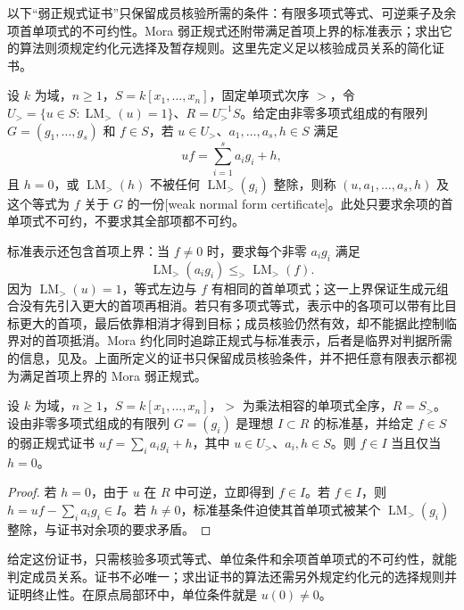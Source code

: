 以下“弱正规式证书”只保留成员核验所需的条件：有限多项式等式、可逆乘子及余项首单项式的不可约性。Mora 弱正规式还附带满足首项上界的标准表示；求出它的算法则须规定约化元选择及暂存规则。这里先定义足以核验成员关系的简化证书。

\begin{definition}\label{b3:def:F-weak-normal-form}
	设 \(k\) 为域，\(n\ge1\)，\(S=k[x_1,\ldots,x_n]\)，固定单项式次序 \(>\)，令 \(U_{>}=\{u\in S:\operatorname{LM}_{>}(u)=1\}\)、\(R=U_{>}^{-1}S\)。给定由非零多项式组成的有限列 \(G=(g_1,\ldots,g_s)\) 和 \(f\in S\)，若 \(u\in U_{>}\)、\(a_1,\ldots,a_s,h\in S\) 满足
	\[
		uf=\sum_{i=1}^s a_ig_i+h,
	\]
	且 \(h=0\)，或 \(\operatorname{LM}_{>}(h)\) 不被任何 \(\operatorname{LM}_{>}(g_i)\) 整除，则称 \((u,a_1,\ldots,a_s,h)\) 及这个等式为 \(f\) 关于 \(G\) 的一份[weak normal form certificate]。此处只要求余项的首单项式不可约，不要求其全部项都不可约。
\end{definition}

标准表示还包含首项上界：当 \(f\ne0\) 时，要求每个非零 \(a_ig_i\) 满足
\[
	\operatorname{LM}_{>}(a_ig_i) \le_{>}\operatorname{LM}_{>}(f).
\]
因为 \(\operatorname{LM}_{>}(u)=1\)，等式左边与 \(f\) 有相同的首单项式；这一上界保证生成元组合没有先引入更大的首项再相消。若只有多项式等式，表示中的各项可以带有比目标更大的首项，最后依靠相消才得到目标；成员核验仍然有效，却不能据此控制临界对的首项抵消。Mora 约化同时追踪正规式与标准表示，后者是临界对判据所需的信息，见\cite[Definitions 5--6, Section 3.1]{MoraPfisterTraverso1989TangentCone}及\cite[Section 2, Theorem 2.14]{Aschenbrenner2005ReductionStandardBases}。上面所定义的证书只保留成员核验条件，并不把任意有限表示都视为满足首项上界的 Mora 弱正规式。

\begin{proposition}\label{b3:prop:F-weak-membership}
	设 \(k\) 为域，\(n\ge1\)，\(S=k[x_1,\ldots,x_n]\)，\(>\) 为乘法相容的单项式全序，\(R=S_{>}\)。设由非零多项式组成的有限列 \(G=(g_i)\) 是理想 \(I\subset R\) 的标准基，并给定 \(f\in S\) 的弱正规式证书 \(uf=\sum_i a_i g_i+h\)，其中 \(u\in U_{>}\)、\(a_i,h\in S\)。则 \(f\in I\) 当且仅当 \(h=0\)。
\end{proposition}
\begin{proof}
	若 \(h=0\)，由于 \(u\) 在 \(R\) 中可逆，立即得到 \(f\in I\)。若 \(f\in I\)，则 \(h=uf-\sum_i a_ig_i\in I\)。若 \(h\ne0\)，标准基条件迫使其首单项式被某个 \(\operatorname{LM}_{>}(g_i)\) 整除，与证书对余项的要求矛盾。
\end{proof}

给定这份证书，只需核验多项式等式、单位条件和余项首单项式的不可约性，就能判定成员关系。证书不必唯一；求出证书的算法还需另外规定约化元的选择规则并证明终止性。在原点局部环中，单位条件就是 \(u(0)\ne0\)。

